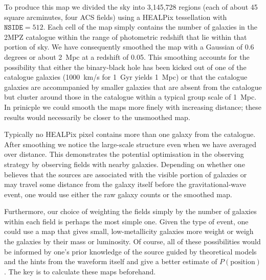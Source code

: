 \documentclass[useAMS,usenatbib]{mn2e}
\begin{document}
To produce this map we divided the sky into 3,145,728 regions (each of
about 45 square arcminutes, four ACS fields) using a HEALPix
\citep{2005ApJ...622..759G} tessellation with $\mathtt{NSIDE}=512$.
Each cell of the map simply contains the number of galaxies in the
2MPZ catalogue within the range of photometric redshift that lie
within that portion of sky.  We have consequently smoothed the map
with a Gaussian of 0.6 degrees or about 2~Mpc at a redshift of 0.05.
This smoothing accounts for the possibility that either the
binary-black hole has been kicked out of one of the catalogue galaxies
(1000~km/s for 1~Gyr yields 1~Mpc) or that the catalogue galaxies are
accommpanied by smaller galaxies that are absent from the catalogue
but cluster around those in the catalogue within a typical group scale
of 1~Mpc.  In prinicple we could smooth the maps more finely with
increasing distance; these results would necessarily be closer to the
unsmoothed map.

Typically no HEALPix pixel contains more than one galaxy
from the catalogue.  After smoothing we notice the large-scale
structure even when we have averaged over distance.  This demonstrates
the potential optimisation in the observing strategy by observing
fields with nearby galaxies. Depending on whether one believes that
the sources are associated with the visible portion of galaxies or may
travel some distance from the galaxy itself before the
gravitational-wave event, one would use either the raw galaxy counts
or the smoothed map.

Furthermore, our choice of weighting the fields simply by the number
of galaxies within each field is perhaps the most simple one.  Given
the type of event, one could use a map that gives small,
low-metallicity galaxies more weight or weigh the galaxies by their
mass or luminosity.  Of course, all of these possibilities would be
informed by one's prior knowledge of the source guided by
theoretical models and the hints from the waveform itself and give a
better estimate of $P(\mathrm{position})$.  The key is to calculate these
maps beforehand. 
\end{document}
